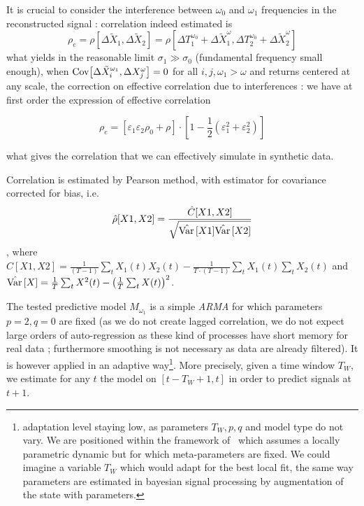 
It is crucial to consider the interference between $\omega_0$ and $\omega_1$ frequencies in the reconstructed signal : correlation indeed estimated is 
\[
\rho_{e} = \rho \left[ \Delta \tilde{X}_1 , \Delta \tilde{X}_2 \right] = \rho \left[ \Delta T_1^{\omega_0} + \Delta \tilde{X}_1^{\omega} , \Delta T_2^{\omega_0} + \Delta \tilde{X}_2^{\omega}\right]
\]
what yields in the reasonable limit $\sigma_1 \gg \sigma_0$ (fundamental frequency small enough), when $\operatorname{Cov}\!\left[\Delta \tilde{X}_i^{\omega_1},\Delta X_j^{\omega}\right]=0$ for all $i,j,\omega_1 > \omega$ and returns centered at any scale, the correction on effective correlation due to interferences : we have at first order the expression of effective correlation

\begin{equation}
\label{eq:eff_corr}
\rho_e = \left[ \varepsilon_1 \varepsilon_2 \rho_0 + \rho \right] \cdot \left[ 1 - \frac{1}{2}\left(\varepsilon_1^2 + \varepsilon_2^2 \right) \right]
\end{equation}

{\noindent}what gives the correlation that we can effectively simulate in synthetic data.

Correlation is estimated by Pearson method, with estimator for covariance corrected for bias, i.e.
\[
\hat{\rho}[X1,X2] = \frac{\hat{C}[X1,X2]}{\sqrt{\hat{\operatorname{Var}{}}[X1]\hat{\operatorname{Var}{}}[X2]}}\]
, where $\hat{C}[X1,X2] = \frac{1}{(T-1)}\sum_{t} X_1(t)X_2(t) - \frac{1}{T\cdot (T-1)} \sum_t X_1(t) \sum_t X_2(t)$ and $\hat{\operatorname{Var}{}}[X] = \frac{1}{T}\sum_t{X^2(t)}-\left(\frac{1}{T}\sum_tX(t)\right)^2$.


The tested predictive model $M_{\omega_1}$ is a simple \emph{ARMA} for which parameters $p=2,q=0$ are fixed (as we do not create lagged correlation, we do not expect large orders of auto-regression as these kind of processes have short memory for real data ; furthermore smoothing is not necessary as data are already filtered). It is however applied in an adaptive way\footnote{adaptation level staying low, as parameters $T_W,p,q$ and model type do not vary. We are positioned within the framework of~\cite{potiron2016estimating} which assumes a locally parametric dynamic but for which meta-parameters are fixed. We could imagine a variable $T_W$ which would adapt for the best local fit, the same way parameters are estimated in bayesian signal processing by augmentation of the state with parameters.}. More precisely, given a time window $T_W$, we estimate for any $t$ the model on $[t-T_W+1,t]$ in order to predict signals at $t+1$.

